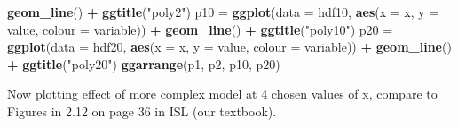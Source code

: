\documentclass[]{article}
\newenvironment{Shaded}{\begin{snugshade}}{\end{snugshade}}
\newcommand{\DataTypeTok}[1]{\textcolor[rgb]{0.13,0.29,0.53}{#1}}
\newcommand{\KeywordTok}[1]{\textcolor[rgb]{0.13,0.29,0.53}{\textbf{#1}}}
\newcommand{\NormalTok}[1]{#1}
\newcommand{\OperatorTok}[1]{\textcolor[rgb]{0.81,0.36,0.00}{\textbf{#1}}}
\newcommand{\StringTok}[1]{\textcolor[rgb]{0.31,0.60,0.02}{#1}}
\begin{document}
\begin{Shaded}
\begin{Highlighting}[]
\StringTok{    }\KeywordTok{geom_line}\NormalTok{() }\OperatorTok{+}\StringTok{ }\KeywordTok{ggtitle}\NormalTok{(}\StringTok{"poly2"}\NormalTok{)}
\NormalTok{p10 =}\StringTok{ }\KeywordTok{ggplot}\NormalTok{(}\DataTypeTok{data =}\NormalTok{ hdf10, }\KeywordTok{aes}\NormalTok{(}\DataTypeTok{x =}\NormalTok{ x, }\DataTypeTok{y =}\NormalTok{ value, }\DataTypeTok{colour =}\NormalTok{ variable)) }\OperatorTok{+}\StringTok{ }
\StringTok{    }\KeywordTok{geom_line}\NormalTok{() }\OperatorTok{+}\StringTok{ }\KeywordTok{ggtitle}\NormalTok{(}\StringTok{"poly10"}\NormalTok{)}
\NormalTok{p20 =}\StringTok{ }\KeywordTok{ggplot}\NormalTok{(}\DataTypeTok{data =}\NormalTok{ hdf20, }\KeywordTok{aes}\NormalTok{(}\DataTypeTok{x =}\NormalTok{ x, }\DataTypeTok{y =}\NormalTok{ value, }\DataTypeTok{colour =}\NormalTok{ variable)) }\OperatorTok{+}\StringTok{ }
\StringTok{    }\KeywordTok{geom_line}\NormalTok{() }\OperatorTok{+}\StringTok{ }\KeywordTok{ggtitle}\NormalTok{(}\StringTok{"poly20"}\NormalTok{)}
\KeywordTok{ggarrange}\NormalTok{(p1, p2, p10, p20)}
\end{Highlighting}
\end{Shaded}

Now plotting effect of more complex model at 4 chosen values of x,
compare to Figures in 2.12 on page 36 in ISL (our textbook).
\end{document}
